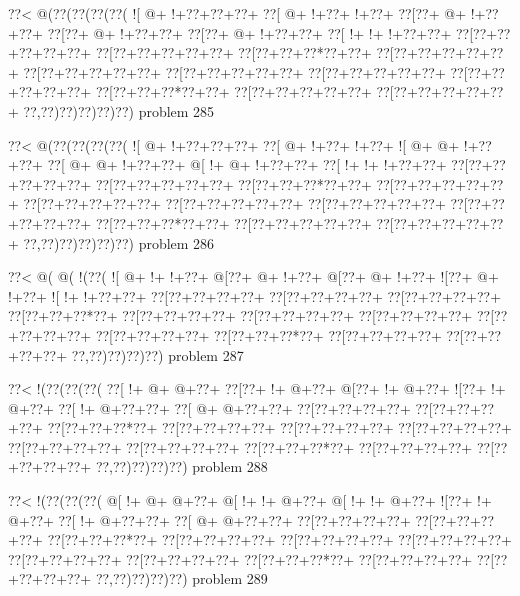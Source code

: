 \vbox{\vbox{\goo
\0??<\- @(\0??(\0??(\0??(\0??(
\- ![\- @+\- !+\0??+\0??+\0??+
\0??[\- @+\- !+\0??+\- !+\0??+
\0??[\0??+\- @+\- !+\0??+\0??+
\0??[\0??+\- @+\- !+\0??+\0??+
\0??[\0??+\- @+\- !+\0??+\0??+
\0??[\- !+\- !+\- !+\0??+\0??+
\0??[\0??+\0??+\0??+\0??+\0??+
\0??[\0??+\0??+\0??+\0??+\0??+
\0??[\0??+\0??+\0??*\0??+\0??+
\0??[\0??+\0??+\0??+\0??+\0??+
\0??[\0??+\0??+\0??+\0??+\0??+
\0??[\0??+\0??+\0??+\0??+\0??+
\0??[\0??+\0??+\0??+\0??+\0??+
\0??[\0??+\0??+\0??+\0??+\0??+
\0??[\0??+\0??+\0??*\0??+\0??+
\0??[\0??+\0??+\0??+\0??+\0??+
\0??[\0??+\0??+\0??+\0??+\0??+
\0??,\0??)\0??)\0??)\0??)\0??)
}
\hfil problem 285\hfil\break
}

\vbox{\vbox{\goo
\0??<\- @(\0??(\0??(\0??(\0??(
\- ![\- @+\- !+\0??+\0??+\0??+
\0??[\- @+\- !+\0??+\- !+\0??+
\- ![\- @+\- @+\- !+\0??+\0??+
\0??[\- @+\- @+\- !+\0??+\0??+
\- @[\- !+\- @+\- !+\0??+\0??+
\0??[\- !+\- !+\- !+\0??+\0??+
\0??[\0??+\0??+\0??+\0??+\0??+
\0??[\0??+\0??+\0??+\0??+\0??+
\0??[\0??+\0??+\0??*\0??+\0??+
\0??[\0??+\0??+\0??+\0??+\0??+
\0??[\0??+\0??+\0??+\0??+\0??+
\0??[\0??+\0??+\0??+\0??+\0??+
\0??[\0??+\0??+\0??+\0??+\0??+
\0??[\0??+\0??+\0??+\0??+\0??+
\0??[\0??+\0??+\0??*\0??+\0??+
\0??[\0??+\0??+\0??+\0??+\0??+
\0??[\0??+\0??+\0??+\0??+\0??+
\0??,\0??)\0??)\0??)\0??)\0??)
}
\hfil problem 286\hfil\break
}

\vbox{\vbox{\goo
\0??<\- @(\- @(\- !(\0??(
\- ![\- @+\- !+\- !+\0??+
\- @[\0??+\- @+\- !+\0??+
\- @[\0??+\- @+\- !+\0??+
\- ![\0??+\- @+\- !+\0??+
\- ![\- !+\- !+\0??+\0??+
\0??[\0??+\0??+\0??+\0??+
\0??[\0??+\0??+\0??+\0??+
\0??[\0??+\0??+\0??+\0??+
\0??[\0??+\0??+\0??*\0??+
\0??[\0??+\0??+\0??+\0??+
\0??[\0??+\0??+\0??+\0??+
\0??[\0??+\0??+\0??+\0??+
\0??[\0??+\0??+\0??+\0??+
\0??[\0??+\0??+\0??+\0??+
\0??[\0??+\0??+\0??*\0??+
\0??[\0??+\0??+\0??+\0??+
\0??[\0??+\0??+\0??+\0??+
\0??,\0??)\0??)\0??)\0??)
}
\hfil problem 287\hfil\break
}

\vbox{\vbox{\goo
\0??<\- !(\0??(\0??(\0??(
\0??[\- !+\- @+\- @+\0??+
\0??[\0??+\- !+\- @+\0??+
\- @[\0??+\- !+\- @+\0??+
\- ![\0??+\- !+\- @+\0??+
\0??[\- !+\- @+\0??+\0??+
\0??[\- @+\- @+\0??+\0??+
\0??[\0??+\0??+\0??+\0??+
\0??[\0??+\0??+\0??+\0??+
\0??[\0??+\0??+\0??*\0??+
\0??[\0??+\0??+\0??+\0??+
\0??[\0??+\0??+\0??+\0??+
\0??[\0??+\0??+\0??+\0??+
\0??[\0??+\0??+\0??+\0??+
\0??[\0??+\0??+\0??+\0??+
\0??[\0??+\0??+\0??*\0??+
\0??[\0??+\0??+\0??+\0??+
\0??[\0??+\0??+\0??+\0??+
\0??,\0??)\0??)\0??)\0??)
}
\hfil problem 288\hfil\break
}

\vbox{\vbox{\goo
\0??<\- !(\0??(\0??(\0??(
\- @[\- !+\- @+\- @+\0??+
\- @[\- !+\- !+\- @+\0??+
\- @[\- !+\- !+\- @+\0??+
\- ![\0??+\- !+\- @+\0??+
\0??[\- !+\- @+\0??+\0??+
\0??[\- @+\- @+\0??+\0??+
\0??[\0??+\0??+\0??+\0??+
\0??[\0??+\0??+\0??+\0??+
\0??[\0??+\0??+\0??*\0??+
\0??[\0??+\0??+\0??+\0??+
\0??[\0??+\0??+\0??+\0??+
\0??[\0??+\0??+\0??+\0??+
\0??[\0??+\0??+\0??+\0??+
\0??[\0??+\0??+\0??+\0??+
\0??[\0??+\0??+\0??*\0??+
\0??[\0??+\0??+\0??+\0??+
\0??[\0??+\0??+\0??+\0??+
\0??,\0??)\0??)\0??)\0??)
}
\hfil problem 289\hfil\break
}

